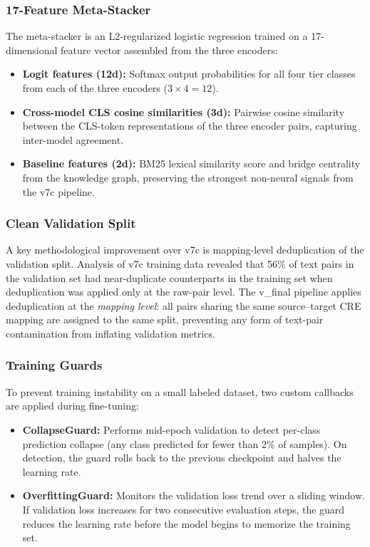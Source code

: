 \subsubsection{17-Feature Meta-Stacker}

The meta-stacker is an L2-regularized logistic regression trained on
a 17-dimensional feature vector assembled from the three encoders:
\begin{itemize}
    \item \textbf{Logit features (12d):} Softmax output probabilities for
          all four tier classes from each of the three encoders
          ($3 \times 4 = 12$).
    \item \textbf{Cross-model CLS cosine similarities (3d):} Pairwise
          cosine similarity between the CLS-token representations of the
          three encoder pairs, capturing inter-model agreement.
    \item \textbf{Baseline features (2d):} BM25 lexical similarity score
          and bridge centrality from the knowledge graph, preserving the
          strongest non-neural signals from the v7c pipeline.
\end{itemize}

\subsubsection{Clean Validation Split}

A key methodological improvement over v7c is mapping-level deduplication
of the validation split. Analysis of v7c training data revealed that
56\% of text pairs in the validation set had near-duplicate counterparts
in the training set when deduplication was applied only at the raw-pair
level. The v\_final pipeline applies deduplication at the
\emph{mapping level}: all pairs sharing the same source--target CRE
mapping are assigned to the same split, preventing any form of
text-pair contamination from inflating validation metrics.

\subsubsection{Training Guards}

To prevent training instability on a small labeled dataset, two
custom callbacks are applied during fine-tuning:
\begin{itemize}
    \item \textbf{CollapseGuard:} Performs mid-epoch validation to
          detect per-class prediction collapse (any class predicted for
          fewer than 2\% of samples). On detection, the guard rolls back
          to the previous checkpoint and halves the learning rate.
    \item \textbf{OverfittingGuard:} Monitors the validation loss trend
          over a sliding window. If validation loss increases for two
          consecutive evaluation steps, the guard reduces the learning
          rate before the model begins to memorize the training set.
\end{itemize}

